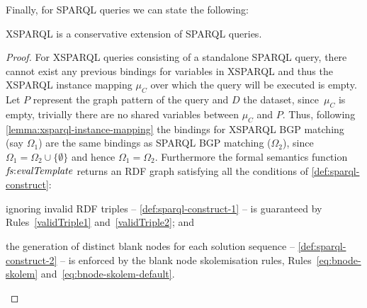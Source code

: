 \noindent
%
Finally, for SPARQL \CONSTRUCT queries we can state the following:
%
\begin{proposition}
\label{prop:xsparqlsparql}
  XSPARQL is a conservative extension of SP\-ARQL \CONSTRUCT queries.
\end{proposition}
%
\begin{proof}
  For XSPARQL queries consisting of a standalone SPARQL \CONSTRUCT query, there cannot exist any previous bindings for
  variables in XSPARQL and thus the XSPARQL instance mapping $\mu_C$ over which the \CONSTRUCT query will be executed is
  empty.  Let $P$ represent the graph pattern of the \CONSTRUCT query and $D$ the dataset, since~$\mu_C$ is empty,
  trivially there are no shared variables between $\mu_C$ and $P$.  Thus, following
  \cref{lemma:xsparql-instance-mapping} the bindings for XSPARQL BGP matching (say $\Omega_1$) are the same
  bindings as SPARQL BGP matching ($\Omega_2$), since $\Omega_1 = \Omega_2 \cup \{\emptyset\}$ and hence $\Omega_1 =
  \Omega_2$.
  Furthermore the formal semantics function $\mathit{fs{:}evalTemplate}$ returns an RDF graph satisfying all the
  conditions of \cref{def:sparql-construct}:
  \begin{inparaenum}[(i)]
  \item ignoring invalid RDF triples -- \cref{def:sparql-construct-1} -- is guaranteed by
    Rules~\eqref{validTriple1} and~\eqref{validTriple2}; and
  \item the generation of distinct blank nodes for each solution sequence -- \cref{def:sparql-construct-2} -- is
    enforced by the blank node skolemisation rules, Rules~\eqref{eq:bnode-skolem} and~\eqref{eq:bnode-skolem-default}.
  \end{inparaenum}
\end{proof}





